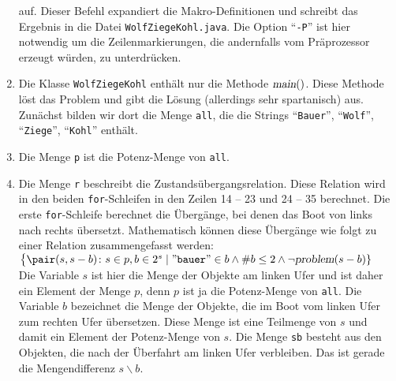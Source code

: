 \begin{enumerate}
      auf.  Dieser Befehl expandiert die Makro-Definitionen und schreibt das Ergebnis in
      die Datei \texttt{WolfZiegeKohl.java}.  Die Option ``\texttt{-P}'' ist hier
      notwendig um die Zeilenmarkierungen, die andernfalls vom Pr\"aprozessor erzeugt
      w\"urden, zu unterdr\"ucken. 
\item Die Klasse \texttt{WolfZiegeKohl} enth\"alt nur die Methode $\textsl{main}()$.
      Diese Methode l\"ost das Problem und gibt die L\"osung (allerdings sehr spartanisch) aus.
      Zun\"achst bilden wir dort die Menge  \texttt{all}, die die Strings
      ``\texttt{Bauer}'',
      ``\texttt{Wolf}'',
      ``\texttt{Ziege}'',
      ``\texttt{Kohl}'' enth\"alt.
\item Die Menge \texttt{p} ist die Potenz-Menge von \texttt{all}.  
\item Die Menge \texttt{r} beschreibt die Zustands\"ubergangsrelation.
      Diese Relation wird in den beiden \texttt{for}-Schleifen in den Zeilen
      14 -- 23 und 24 -- 35 berechnet.
      Die erste \texttt{for}-Schleife berechnet die Überg\"ange, bei denen
      das Boot von links nach rechts \"ubersetzt.  Mathematisch k\"onnen diese Überg\"ange wie
      folgt zu einer Relation zusammengefasst werden:
      \\[0.2cm]
      \hspace*{1.3cm}
      $\bigl\{ \pair(s, s - b) \colon s \in p, b \in  2^s \mid
               \mathtt{\symbol{34}bauer\symbol{34}} \in b \wedge \#b \leq 2 \wedge \neg
               \textsl{problem}(s - b) \}$
      \\[0.2cm]
      Die Variable $s$ ist hier die Menge der Objekte am linken Ufer und ist daher ein
      Element der Menge $p$, denn $p$ ist ja die Potenz-Menge von \texttt{all}.  Die
      Variable $b$ bezeichnet die Menge der Objekte, die im Boot vom linken Ufer zum
      rechten Ufer \"ubersetzen.  Diese Menge ist eine
      Teilmenge von $s$ und damit ein Element der Potenz-Menge von $s$.  
      Die Menge \texttt{sb} besteht
      aus den Objekten, die nach der Überfahrt am linken Ufer verbleiben.
      Das ist gerade die Mengendifferenz $s \backslash b$.  
      

\end{enumerate}

